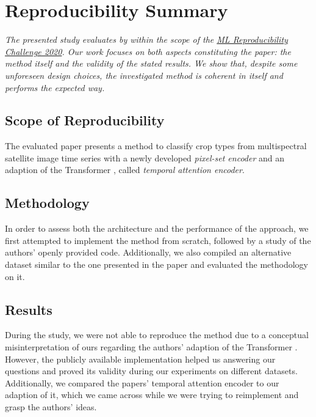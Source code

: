 \section*{\centering Reproducibility Summary}

\textit{The presented study evaluates  by \textcite{Garnot20:SIT} within the scope of the \href{https://paperswithcode.com/rc2020}{ML Reproducibility Challenge 2020}.
Our work focuses on both aspects constituting the paper:
the method itself and the validity of the stated results.
We show that, despite some unforeseen design choices, the investigated method is coherent in itself and performs the expected way.}


\subsection*{Scope of Reproducibility}

The evaluated paper presents a method to classify crop types from multispectral satellite image time series with a newly developed \emph{pixel-set encoder} and an adaption of the Transformer \parencite{Vaswani17:Attention}, called \emph{temporal attention encoder}. 


\subsection*{Methodology}

In order to assess both the architecture and the performance of the approach, we first attempted to implement the method from scratch, followed by a study of the authors' openly provided code.
Additionally, we also compiled an alternative dataset similar to the one presented in the paper and evaluated the methodology on it.


\subsection*{Results}

During the study, we were not able to reproduce the method due to a conceptual misinterpretation of ours regarding the authors' adaption of the Transformer \parencite{Vaswani17:Attention}.
However, the publicly available implementation helped us answering our questions and proved its validity during our experiments on different datasets.
Additionally, we compared the papers' temporal attention encoder to our adaption of it, which we came across while we were trying to reimplement and grasp the authors' ideas.


